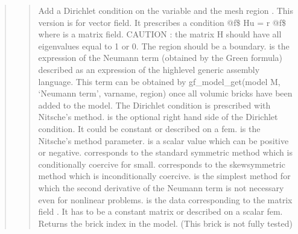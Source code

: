\documentclass[a4paper,11pt,english]{sphinxmanual}
\begin{document}
\begin{quote}
\sphinxAtStartPar
{}
\begin{quote}

\sphinxAtStartPar
Add a Dirichlet condition on the variable  and the mesh
region .
This version is for vector field. It prescribes a condition
@f\$ Hu = r @f\$ where  is a matrix field.
CAUTION : the matrix H should have all eigenvalues equal to 1 or 0.
The region should be a boundary.   
is the expression of the Neumann term (obtained by the Green formula)
described as an expression of the high\sphinxhyphen{}level
generic assembly language. This term can be obtained by
gf\_model\_get(model M, ‘Neumann term’, varname, region) once all volumic bricks have
been added to the model.  The Dirichlet
condition is prescribed with Nitsche’s method.  is the optional
right hand side of the Dirichlet condition. It could be constant or
described on a fem.  is the
Nitsche’s method parameter.  is a scalar value which can be
positive or negative.  corresponds to the standard symmetric
method which is conditionally coercive for   small.
 corresponds to the skew\sphinxhyphen{}symmetric method which is
inconditionally coercive.  is the simplest method
for which the second derivative of the Neumann term is not necessary
even for nonlinear problems.  is the data
corresponding to the matrix field . It has to be a constant matrix
or described on a scalar fem. Returns the brick index in the model.
(This brick is not fully tested)
\end{quote}

\sphinxAtStartPar
{}
\begin{quote}


\end{quote}
\end{quote}
\end{document}
